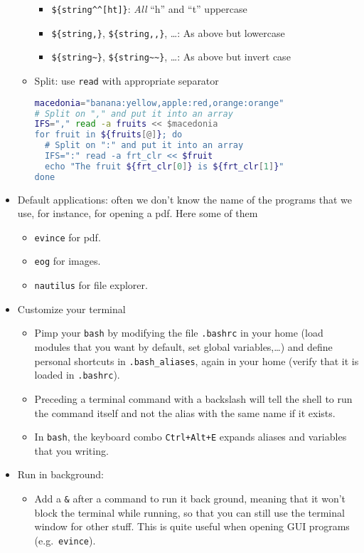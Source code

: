 \documentclass[a4paper,12pt,%
              final%
              ]{article}
\begin{document}
\begin{itemize}
\begin{itemize}
\begin{itemize}
          \item \verb|${string^^[ht]}|: \emph{All} ``h'' and ``t'' uppercase
          \item \verb|${string,}|, \verb|${string,,}|, \ldots: As above but lowercase
          \item \verb|${string~}|, \verb|${string~~}|, \ldots: As above but invert case
        \end{itemize}
      \item Split: use \texttt{read} with appropriate separator
\begin{lstlisting}[language=bash]
macedonia="banana:yellow,apple:red,orange:orange"
# Split on "," and put it into an array
IFS="," read -a fruits << $macedonia
for fruit in ${fruits[@]}; do
  # Split on ":" and put it into an array
  IFS=":" read -a frt_clr << $fruit
  echo "The fruit ${frt_clr[0]} is ${frt_clr[1]}"
done
\end{lstlisting}
    \end{itemize}
  \item Default applications: often we don't know the name of the programs that we use, for instance, for opening a pdf. Here some of them
    \begin{itemize}
      \item \texttt{evince} for pdf.
      \item \texttt{eog} for images.
      \item \texttt{nautilus} for file explorer.
    \end{itemize}
  \item Customize your terminal
    \begin{itemize}
      \item Pimp your \texttt{bash} by modifying the file \texttt{.bashrc} in your home (load modules that you want by default, set global variables,\ldots) and define personal shortcuts in \texttt{.bash\_aliases}, again in your home (verify that it is loaded in \texttt{.bashrc}).
      \item Preceding a terminal command with a backslash will tell the shell to run the command itself and not the alias with the same name if it exists.
      \item In \texttt{bash}, the keyboard combo \texttt{Ctrl+Alt+E} expands aliases and variables that you writing.
    \end{itemize}
  \item Run in background:
    \begin{itemize}
      \item Add a \verb|&| after a command to run it back ground, meaning that it won't block the terminal while running, so that you can still use the terminal window for other stuff. This is quite useful when opening GUI programs (e.g.\ \texttt{evince}).

\end{itemize}
\end{itemize}
\end{document}
